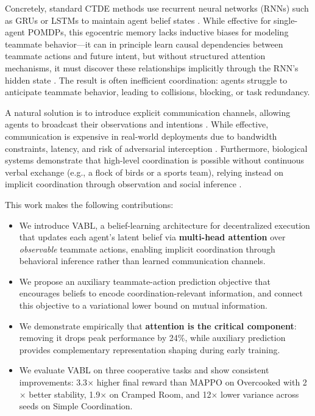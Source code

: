 \documentclass{article}
\theoremstyle{plain}
\theoremstyle{definition}
\theoremstyle{remark}
\begin{document}
Concretely, standard CTDE methods use recurrent neural networks (RNNs) such as GRUs or LSTMs to maintain agent belief states \cite{hausknecht2015deep}. While effective for single-agent POMDPs, this egocentric memory lacks inductive biases for modeling teammate behavior---it can in principle learn causal dependencies between teammate actions and future intent, but without structured attention mechanisms, it must discover these relationships implicitly through the RNN's hidden state \cite{phan2023attention}. The result is often inefficient coordination: agents struggle to anticipate teammate behavior, leading to collisions, blocking, or task redundancy.

A natural solution is to introduce explicit communication channels, allowing agents to broadcast their observations and intentions \cite{foerster2016learning, wang2020learning}. While effective, communication is expensive in real-world deployments due to bandwidth constraints, latency, and risk of adversarial interception \cite{liu2025robust}. Furthermore, biological systems demonstrate that high-level coordination is possible without continuous verbal exchange (e.g., a flock of birds or a sports team), relying instead on implicit coordination through observation and social inference \cite{li2020deep}.

This work makes the following contributions:
\begin{itemize}
  \item We introduce VABL, a belief-learning architecture for decentralized execution that updates each agent's latent belief via \textbf{multi-head attention} over \emph{observable} teammate actions, enabling implicit coordination through behavioral inference rather than learned communication channels.
  \item We propose an auxiliary teammate-action prediction objective that encourages beliefs to encode coordination-relevant information, and connect this objective to a variational lower bound on mutual information.
  \item We demonstrate empirically that \textbf{attention is the critical component}: removing it drops peak performance by 24\%, while auxiliary prediction provides complementary representation shaping during early training.
  \item We evaluate VABL on three cooperative tasks and show consistent improvements: 3.3$\times$ higher final reward than MAPPO on Overcooked with 2$\times$ better stability, 1.9$\times$ on Cramped Room, and 12$\times$ lower variance across seeds on Simple Coordination.
\end{itemize}
\end{document}
